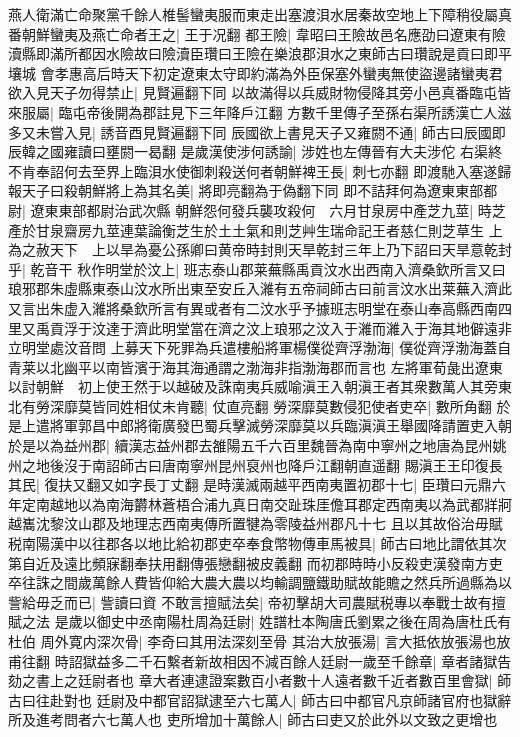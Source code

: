 燕人衛滿亡命聚黨千餘人椎髻蠻夷服而東走出塞渡浿水居秦故空地上下障稍役屬真番朝鮮蠻夷及燕亡命者王之|{
	王于况翻}
都王險|{
	韋昭曰王險故邑名應劭曰遼東有險瀆縣即滿所都因水險故曰險瀆臣瓚曰王險在樂浪郡浿水之東師古曰瓚說是貢曰即平壤城}
會孝惠高后時天下初定遼東太守即約滿為外臣保塞外蠻夷無使盜邊諸蠻夷君欲入見天子勿得禁止|{
	見賢遍翻下同}
以故滿得以兵威財物侵降其旁小邑真番臨屯皆來服屬|{
	臨屯帝後開為郡註見下三年降戶江翻}
方數千里傳子至孫右渠所誘漢亡人滋多又未嘗入見|{
	誘音酉見賢遍翻下同}
辰國欲上書見天子又雍閼不通|{
	師古曰辰國即辰韓之國雍讀曰壅閼一曷翻}
是歲漢使涉何誘諭|{
	涉姓也左傳晉有大夫涉佗}
右渠終不肯奉詔何去至界上臨浿水使御刺殺送何者朝鮮裨王長|{
	刺七亦翻}
即渡馳入塞遂歸報天子曰殺朝鮮將上為其名美|{
	將即亮翻為于偽翻下同}
即不詰拜何為遼東東部都尉|{
	遼東東部都尉治武次縣}
朝鮮怨何發兵襲攻殺何　六月甘泉房中產芝九莖|{
	時芝產於甘泉齋房九莖連葉論衡芝生於土土氣和則芝艸生瑞命記王者慈仁則芝草生}
上為之赦天下　上以旱為憂公孫卿曰黄帝時封則天旱乾封三年上乃下詔曰天旱意乾封乎|{
	乾音干}
秋作明堂於汶上|{
	班志泰山郡莱蕪縣禹貢汶水出西南入濟桑欽所言又曰琅邪郡朱虛縣東泰山汶水所出東至安丘入濰有五帝祠師古曰前言汶水出莱蕪入濟此又言出朱虚入濰將桑欽所言有異或者有二汶水乎予據班志明堂在泰山奉高縣西南四里又禹貢浮于汶達于濟此明堂當在濟之汶上琅邪之汶入于濰而濰入于海其地僻遠非立明堂處汶音問}
上募天下死罪為兵遣樓船將軍楊僕從齊浮渤海|{
	僕從齊浮渤海蓋自青莱以北幽平以南皆濱于海其海通謂之渤海非指渤海郡而言也}
左將軍荀彘出遼東以討朝鮮　初上使王然于以越破及誅南夷兵威喻滇王入朝滇王者其衆數萬人其旁東北有勞深靡莫皆同姓相仗未肯聽|{
	仗直亮翻}
勞深靡莫數侵犯使者吏卒|{
	數所角翻}
於是上遣將軍郭昌中郎將衛廣發巴蜀兵擊滅勞深靡莫以兵臨滇滇王舉國降請置吏入朝於是以為益州郡|{
	續漢志益州郡去雒陽五千六百里魏晉為南中寧州之地唐為昆州姚州之地後沒于南詔師古曰唐南寧州昆州裒州也降戶江翻朝直遥翻}
賜滇王王印復長其民|{
	復扶又翻又如字長丁丈翻}
是時漢滅兩越平西南夷置初郡十七|{
	臣瓚曰元鼎六年定南越地以為南海欝林蒼梧合浦九真日南交趾珠厓儋耳郡定西南夷以為武都牂牁越巂沈黎汶山郡及地理志西南夷傳所置犍為零陵益州郡凡十七}
且以其故俗治毋賦税南陽漢中以往郡各以地比給初郡吏卒奉食幣物傳車馬被具|{
	師古曰地比謂依其次第自近及遠比頻寐翻奉扶用翻傳張戀翻被皮義翻}
而初郡時時小反殺吏漢發南方吏卒往誅之間歲萬餘人費皆仰給大農大農以均輸調鹽鐵助賦故能贍之然兵所過縣為以訾給毋乏而已|{
	訾讀曰資}
不敢言擅賦法矣|{
	帝初擊胡大司農賦税專以奉戰士故有擅賦之法}
是歲以御史中丞南陽杜周為廷尉|{
	姓譜杜本陶唐氏劉累之後在周為唐杜氏有杜伯}
周外寛内深次骨|{
	李奇曰其用法深刻至骨}
其治大放張湯|{
	言大抵依放張湯也放甫往翻}
時詔獄益多二千石繫者新故相因不減百餘人廷尉一歲至千餘章|{
	章者諸獄告劾之書上之廷尉者也}
章大者連逮證案數百小者數十人遠者數千近者數百里會獄|{
	師古曰往赴對也}
廷尉及中都官詔獄逮至六七萬人|{
	師古曰中都官凡京師諸官府也獄辭所及進考問者六七萬人也}
吏所增加十萬餘人|{
	師古曰吏又於此外以文致之更增也}


